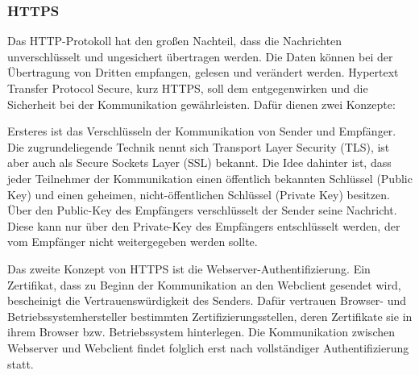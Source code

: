 
\subsubsection{HTTPS}
Das HTTP-Protokoll hat den großen Nachteil, dass die Nachrichten unverschlüsselt und ungesichert übertragen werden. 
Die Daten können bei der Übertragung von Dritten empfangen, gelesen und verändert werden. Hypertext Transfer Protocol Secure, kurz HTTPS, soll dem entgegenwirken und die Sicherheit bei der Kommunikation gewährleisten. 
Dafür dienen zwei Konzepte:
\newline

Ersteres ist das Verschlüsseln der Kommunikation von Sender und Empfänger. Die zugrundeliegende Technik nennt sich Transport Layer Security (TLS), ist aber auch als Secure Sockets Layer (SSL) bekannt. Die Idee dahinter ist, dass jeder Teilnehmer der Kommunikation einen öffentlich bekannten Schlüssel (Public Key) und einen geheimen, nicht-öffentlichen Schlüssel (Private Key) besitzen. Über den Public-Key des Empfängers verschlüsselt der Sender seine Nachricht. Diese kann nur über den Private-Key des Empfängers entschlüsselt werden, der vom Empfänger nicht weitergegeben werden sollte.
\newline

Das zweite Konzept von HTTPS ist die Webserver-Authentifizierung. Ein Zertifikat, dass zu Beginn der Kommunikation an den Webclient gesendet wird, bescheinigt die Vertrauenswürdigkeit des Senders. Dafür vertrauen Browser- und Betriebssystemhersteller bestimmten Zertifizierungsstellen, deren Zertifikate sie in ihrem Browser bzw. Betriebssystem hinterlegen. Die Kommunikation zwischen Webserver und Webclient findet folglich erst nach vollständiger Authentifizierung statt.
